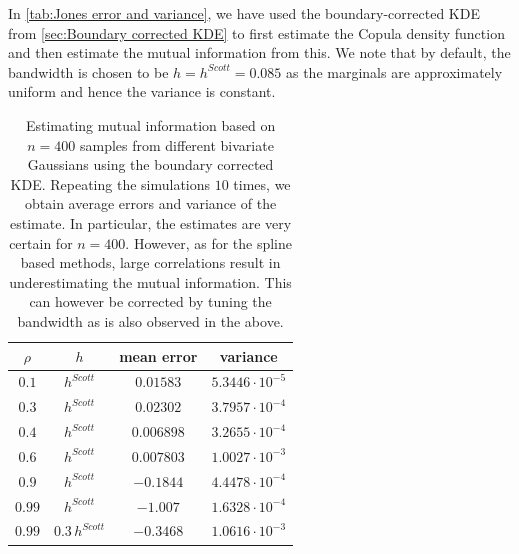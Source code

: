 \documentclass[../Thesis.tex]{subfiles}
\begin{document}
In \autoref{tab:Jones error and variance}, we have used the boundary-corrected KDE from \autoref{sec:Boundary corrected KDE} to first estimate the Copula density function and then estimate the mutual information from this. We note that by default, the bandwidth is chosen to be $h = h^{Scott} = 0.085$ as the marginals are approximately uniform and hence the variance is constant.
\begin{table}[ht]
    \centering
    \begin{tabular}{c|c|c|c}
        $\rho$ & $h$              & mean error  & variance                 \\\hline
        $0.1$  & $h^{Scott}$      & $ 0.01583$  & $5.3446 \cdot 10^{-5}$   \\
        $0.3$  & $h^{Scott}$      & $ 0.02302$  & $3.7957 \cdot 10^{-4}$   \\
        $0.4$  & $h^{Scott}$      & $ 0.006898$ & $3.2655  \cdot 10^{-4}$  \\
        $0.6$  & $h^{Scott}$      & $ 0.007803$ & $1.0027  \cdot 10^{-3}$  \\
        $0.9$  & $h^{Scott}$      & $-0.1844$   & $4.4478  \cdot 10^{-4} $ \\
        $0.99$ & $h^{Scott}$      & $-1.007$    & $1.6328  \cdot 10^{-4}$  \\
        $0.99$ & $0.3\,h^{Scott}$ & $-0.3468$   & $1.0616  \cdot 10^{-3}$
    \end{tabular}
    \caption{Estimating mutual information based on $n=400$ samples from different bivariate Gaussians using the boundary corrected KDE. Repeating the simulations $10$ times, we obtain average errors and variance of the estimate. In particular, the estimates are very certain for $n=400$. However, as for the spline based methods, large correlations result in underestimating the mutual information. This can however be corrected by tuning the bandwidth as is also observed in the above.}
    \label{tab:Jones error and variance}
\end{table}
\end{document}

